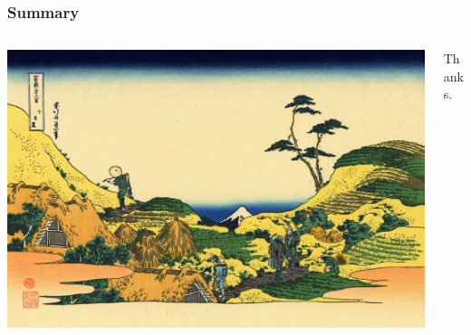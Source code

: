 \documentclass[xcolor=table]{beamer}
\begin{document}


\begin{frame}
\frametitle{Summary}

\begin{columns}
\begin{column}{0.7\textwidth}
\includegraphics[width=\textwidth]{images/fuji15.jpg}
\end{column}
\begin{column}{0.3\textwidth}
Thanks.
\end{column}


\end{columns}

\end{frame}




 
\end{document}
